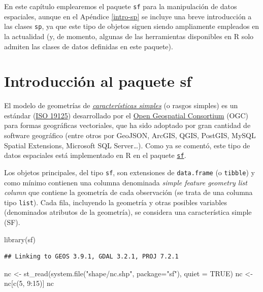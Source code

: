 \documentclass[
  spanish,
]{book}
\newenvironment{Shaded}{\begin{snugshade}}{\end{snugshade}}
\newcommand{\AttributeTok}[1]{\textcolor[rgb]{0.77,0.63,0.00}{#1}}
\newcommand{\ConstantTok}[1]{\textcolor[rgb]{0.00,0.00,0.00}{#1}}
\newcommand{\DecValTok}[1]{\textcolor[rgb]{0.00,0.00,0.81}{#1}}
\newcommand{\FunctionTok}[1]{\textcolor[rgb]{0.00,0.00,0.00}{#1}}
\newcommand{\NormalTok}[1]{#1}
\newcommand{\OtherTok}[1]{\textcolor[rgb]{0.56,0.35,0.01}{#1}}
\newcommand{\SpecialCharTok}[1]{\textcolor[rgb]{0.00,0.00,0.00}{#1}}
\newcommand{\StringTok}[1]{\textcolor[rgb]{0.31,0.60,0.02}{#1}}
\theoremstyle{break}
\theoremstyle{definition}
\theoremstyle{definition}
\theoremstyle{definition}
\theoremstyle{definition}
\theoremstyle{remark}
\begin{document}
En este capítulo emplearemos el paquete \texttt{sf} para la manipulación de datos espaciales, aunque en el Apéndice \ref{intro-sp} se incluye una breve introducción a las clases \texttt{sp}, ya que este tipo de objetos siguen siendo ampliamente empleados en la actualidad (y, de momento, algunas de las herramientas disponibles en R solo admiten las clases de datos definidas en este paquete).

\hypertarget{sf-intro}{%
\section{\texorpdfstring{Introducción al paquete \textbf{sf}}{Introducción al paquete sf}}\label{sf-intro}}

El modelo de geometrías de \emph{\href{https://en.wikipedia.org/wiki/Simple_Features}{características simples}} (o rasgos simples) es un estándar (\href{https://www.iso.org/standard/40114.html}{ISO 19125}) desarrollado por el \href{https://www.ogc.org}{Open Geospatial Consortium} (OGC) para formas geográficas vectoriales, que ha sido adoptado por gran cantidad de software geográfico (entre otros por GeoJSON, ArcGIS, QGIS, PostGIS, MySQL Spatial Extensions, Microsoft SQL Server\ldots).
Como ya se comentó, este tipo de datos espaciales está implementado en R en el paquete \href{https://r-spatial.github.io/sf}{\texttt{sf}}.

Los objetos principales, del tipo \texttt{sf}, son extensiones de \texttt{data.frame} (o \texttt{tibble}) y como mínimo contienen una columna denominada \emph{simple feature geometry list column} que contiene la geometría de cada observación (se trata de una columna tipo \texttt{list}).
Cada fila, incluyendo la geometría y otras posibles variables (denominados atributos de la geometría), se considera una característica simple (SF).

\begin{Shaded}
\begin{Highlighting}[]
\FunctionTok{library}\NormalTok{(sf)}
\end{Highlighting}
\end{Shaded}

\begin{verbatim}
## Linking to GEOS 3.9.1, GDAL 3.2.1, PROJ 7.2.1
\end{verbatim}

\begin{Shaded}
\begin{Highlighting}[]
\NormalTok{nc }\OtherTok{\textless{}{-}} \FunctionTok{st\_read}\NormalTok{(}\FunctionTok{system.file}\NormalTok{(}\StringTok{"shape/nc.shp"}\NormalTok{, }\AttributeTok{package=}\StringTok{"sf"}\NormalTok{), }\AttributeTok{quiet =} \ConstantTok{TRUE}\NormalTok{)}
\NormalTok{nc }\OtherTok{\textless{}{-}}\NormalTok{ nc[}\FunctionTok{c}\NormalTok{(}\DecValTok{5}\NormalTok{, }\DecValTok{9}\SpecialCharTok{:}\DecValTok{15}\NormalTok{)]}
\NormalTok{nc}
\end{Highlighting}
\end{Shaded}
\end{document}
